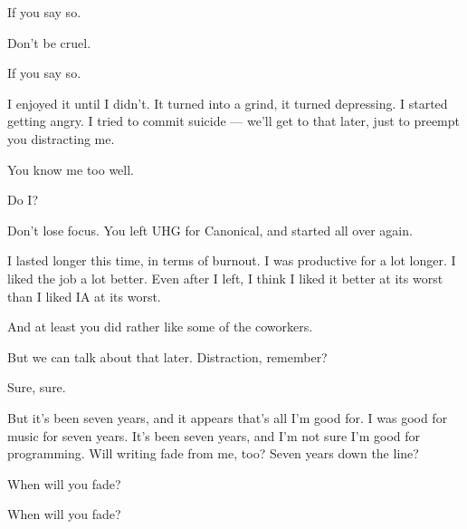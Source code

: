 \begin{ally}
If you say so.
\end{ally}
Don't be cruel.

\begin{ally}
If you say so.
\end{ally}
\newpage

\noindent I enjoyed it until I didn't. It turned into a grind, it turned depressing. I started getting angry. I tried to commit suicide --- we'll get to that later, just to preempt you distracting me.

\begin{ally}
You know me too well.
\end{ally}
Do I?

\begin{ally}
Don't lose focus. You left UHG for Canonical, and started all over again.
\end{ally}
I lasted longer this time, in terms of burnout. I was productive for a lot longer. I liked the job a lot better. Even after I left, I think I liked it better at its worst than I liked IA at its worst.

\begin{ally}
And at least you did rather like some of the coworkers.
\end{ally}
But we can talk about that later. Distraction, remember?

\begin{ally}
Sure, sure.
\end{ally}
But it's been seven years, and it appears that's all I'm good for. I was good for music for seven years. It's been seven years, and I'm not sure I'm good for programming. Will writing fade from me, too? Seven years down the line?

When will you fade?

\begin{ally}
When will you fade?
\end{ally}
\newpage
